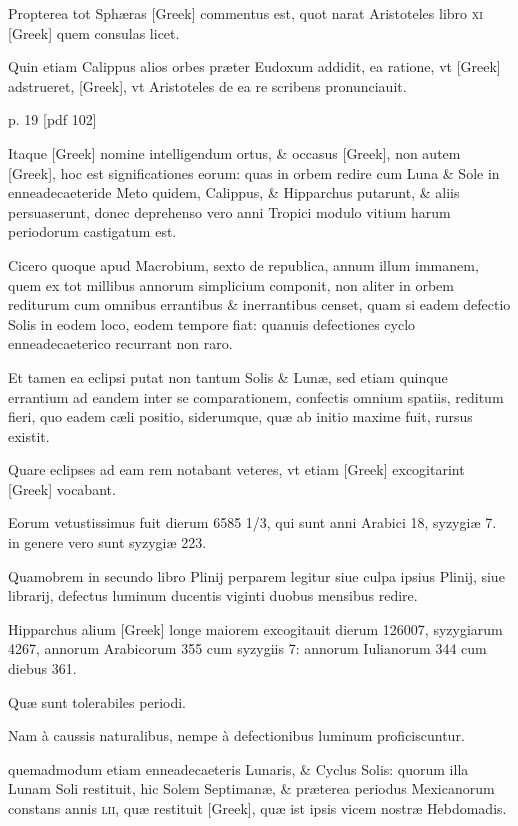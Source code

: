 Propterea tot Sphæras \textgreek{[Greek]} commentus
est, quot narat Aristoteles libro \textsc{xi} \textgreek{[Greek]} quem
consulas licet.

Quin etiam Calippus alios orbes præter Eudoxum
addidit, ea ratione, vt \textgreek{[Greek]} adstrueret, \textgreek{[Greek]},
vt Aristoteles de ea re scribens pronunciauit.



p. 19 [pdf 102]


Itaque \textgreek{[Greek]} nomine intelligendum ortus,
 \& occasus \textgreek{[Greek]},
non autem \textgreek{[Greek]}, hoc est significationes
eorum: quas in orbem redire cum Luna \& Sole in enneadecaeteride
Meto quidem, Calippus, \& Hipparchus putarunt, \& aliis
persuaserunt, donec deprehenso vero anni Tropici modulo vitium
harum periodorum castigatum est.

Cicero quoque apud Macrobium,
sexto de republica, annum illum immanem, quem ex tot millibus
annorum simplicium componit, non aliter in orbem rediturum
cum omnibus errantibus \& inerrantibus censet, quam si eadem defectio
Solis in eodem loco, eodem tempore fiat: quanuis defectiones
cyclo enneadecaeterico recurrant non raro.

Et tamen ea eclipsi putat
non tantum Solis \& Lunæ, sed etiam quinque errantium ad eandem
inter se comparationem, confectis omnium spatiis, reditum fieri, quo
eadem cæli positio, siderumque, quæ ab initio maxime fuit, rursus existit.

Quare eclipses ad eam rem notabant veteres, vt etiam \textgreek{[Greek]}
excogitarint \textgreek{[Greek]} vocabant.

Eorum vetustissimus fuit
dierum 6585 1/3, qui sunt anni Arabici 18, syzygiæ 7. in genere vero
sunt syzygiæ 223.

Quamobrem in secundo libro Plinij perparem legitur
siue culpa ipsius Plinij, siue librarij, defectus luminum ducentis
viginti duobus mensibus redire.

Hipparchus alium \textgreek{[Greek]} longe
maiorem excogitauit dierum 126007, syzygiarum 4267, annorum
Arabicorum 355 cum syzygiis 7: annorum Iulianorum 344 cum
diebus 361.

Quæ sunt tolerabiles periodi.

Nam à caussis naturalibus,
nempe à defectionibus luminum proficiscuntur.

quemadmodum
etiam enneadecaeteris Lunaris, \& Cyclus Solis: quorum illa Lunam
Soli restituit, hic Solem Septimanæ, \& præterea periodus Mexicanorum
constans annis \textsc{lii}, quæ restituit \textgreek{[Greek]}, quæ ist ipsis
vicem nostræ Hebdomadis.

